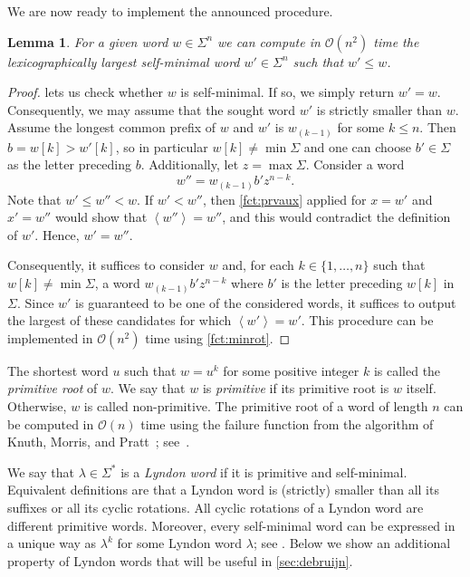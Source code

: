 \documentclass{article}
\newcommand{\mayqed}{}
\newcommand{\Oh}{\mathcal{O}}
\newcommand{\minrot}[1]{\left\langle #1 \right\rangle}
\newtheorem{lemma}[theorem]{Lemma}
\theoremstyle{definition}
\theoremstyle{remark}
\begin{document}
We are now ready to implement the announced procedure.

\begin{lemma}\label{lem:prv}
  For a given word $w\in \Sigma^n$ we can compute in $\Oh(n^2)$ time the
  lexicographically largest self-minimal word $w'\in \Sigma^n$ such that $w'\le w$.
\end{lemma}
\begin{proof}
   lets us check whether $w$ is self-minimal. If so, we simply return $w'=w$.
  Consequently, we may assume that the sought word $w'$ is strictly smaller than $w$.
  Assume the longest common prefix of $w$ and $w'$ 
  is $w_{(k-1)}$ for some $k\le n$.
  Then $b=w[k] > w'[k]$, so
  in particular $w[k]\ne \min \Sigma$ and one can choose $b'\in\Sigma$
  as the letter preceding $b$. Additionally, let $z=\max\Sigma$.
  Consider a word $$w''=w_{(k-1)} b' z^{n-k}.$$
  Note that $w' \le w'' < w$.
  If $w'<w''$, then \cref{fct:prvaux} applied for $x=w'$ and $x'=w''$
  would show that $\minrot{w''}=w''$, and this would contradict the definition of $w'$.
  Hence, $w'=w''$.
    
  Consequently, it suffices to consider $w$ and,
  for each $k\in\{1,\ldots,n\}$ such that $w[k]\ne \min \Sigma$,
  a word $w_{(k-1)}b'z^{n-k}$ where $b'$ is the letter preceding $w[k]$ in $\Sigma$.
  Since $w'$ is guaranteed to be one of the considered words,
  it suffices to output the largest of these candidates for which $\minrot{w'}=w'$.
  This procedure can be implemented in $\Oh(n^2)$ time using \cref{fct:minrot}.
\mayqed\end{proof}

The shortest word $u$ such that $w=u^k$ for some positive integer $k$ is called the
\emph{primitive root} of $w$. We say that $w$ is \emph{primitive} if its primitive root is $w$ itself.
Otherwise, $w$ is called non-primitive.
The primitive root of a word of length $n$ can be computed in $\Oh(n)$ time 
using the failure function from the algorithm of Knuth, Morris, and Pratt~\cite{DBLP:journals/siamcomp/KnuthMP77};
see~\cite{AlgorithmsOnStrings}.

We say that $\lambda \in \Sigma^*$ is a \emph{Lyndon word} if it is primitive and self-minimal.
Equivalent definitions are that a Lyndon word is (strictly) smaller than all its suffixes or all its cyclic rotations.
All cyclic rotations of a Lyndon word are different primitive words.
Moreover, every self-minimal word can be expressed in a unique way as $\lambda^k$
for some Lyndon word $\lambda$; see \cite{Lothaire}.
Below we show an additional property of Lyndon words that will be useful in \cref{sec:debruijn}.
\end{document}
